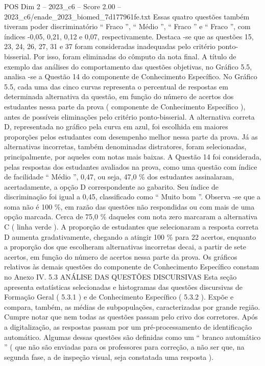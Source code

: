 \begin{textsample}{POS Dim 2 – 2023\_c6 – Score 2.00 – 2023\_c6/enade\_2023\_biomed\_7d177961fe.txt}
Essas quatro questões também tiveram poder discriminatório “ Fraco ”, “ Médio ”, “ Fraco ” e “ Fraco ”, com índices -0,05, 0,21, 0,12 e 0,07, respectivamente.
Destaca -se que as questões 15, 23, 24, 26, 27, 31 e 37 foram consideradas inadequadas pelo critério ponto-bisserial.
Por isso, foram eliminadas do cômputo da nota final.
A título de exemplo das análises do comportamento das questões objetivas, no Gráfico 5.5, analisa -se a Questão 14 do componente de Conhecimento Específico.
No Gráfico 5.5, cada uma das cinco curvas representa o percentual de respostas em determinada alternativa da questão, em função do número de acertos dos estudantes nessa parte da prova ( componente de Conhecimento Específico ), antes de possíveis eliminações pelo critério ponto-bisserial.
A alternativa correta D, representada no gráfico pela curva em azul, foi escolhida em maiores proporções pelos estudantes com desempenho melhor nessa parte da prova.
Já as alternativas incorretas, também denominadas distratores, foram selecionadas, principalmente, por aqueles com notas mais baixas.
A Questão 14 foi considerada, pelas respostas dos estudantes avaliados na prova, como uma questão com índice de facilidade “ Médio ”, 0,47, ou seja, 47,0 \% dos estudantes assinalaram, acertadamente, a opção D correspondente ao gabarito.
Seu índice de discriminação foi igual a 0,45, classificado como “ Muito bom ”.
Observa -se que a soma não é 100 \%, em razão das questões não respondidas ou com mais de uma opção marcada.
Cerca de 75,0 \% daqueles com nota zero marcaram a alternativa C ( linha verde ).
A proporção de estudantes que selecionaram a resposta correta D aumenta gradativamente, chegando a atingir 100 \% para 22 acertos, enquanto a proporção dos que escolheram alternativas incorretas decai, a partir de sete acertos, em função do número de acertos nessa parte da prova.
Os gráficos relativos às demais questões do componente de Conhecimento Específico constam no Anexo IV. 5.3 ANÁLISE DAS QUESTÕES DISCURSIVAS Esta seção apresenta estatísticas selecionadas e histogramas das questões discursivas de Formação Geral ( 5.3.1 ) e de Conhecimento Específico ( 5.3.2 ).
Expõe e compara, também, as médias de subpopulações, caracterizadas por grande região.
Cumpre notar que nem todas as questões passam pelo crivo dos corretores.
Após a digitalização, as respostas passam por um pré-processamento de identificação automático.
Algumas dessas questões são definidas como um “ branco automático ” ( que não são enviadas para os professores para correção, a não ser que, na segunda fase, a de inspeção visual, seja constatada uma resposta ).

\end{textsample}

